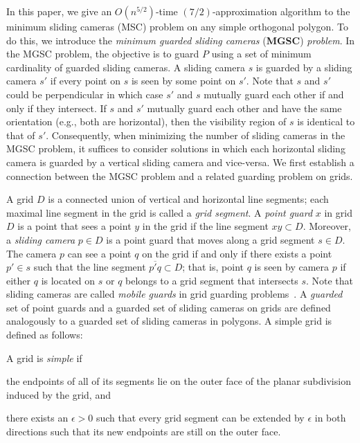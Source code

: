 \documentclass{llncs}
\begin{document}
In this paper, we give an $O(n^{5/2})$-time $(7/2)$-approximation algorithm to the minimum sliding cameras (MSC)
problem on any simple orthogonal polygon.
To do this, we introduce the \emph{minimum guarded sliding cameras} ({\bf MGSC})
\emph{problem}. In the MGSC problem, the objective is to guard $P$ using a set of minimum
cardinality of guarded sliding cameras.
A sliding camera $s$ is guarded by a sliding camera $s'$ if every point on $s$ is seen by some point on $s'$. Note that $s$ and $s'$ could be perpendicular in which case $s'$ and $s$ mutually guard each other if and only if they intersect. If $s$ and $s'$ mutually guard each other and have the same orientation (e.g., both are horizontal), then the visibility region of $s$ is identical to that of $s'$. Consequently, when minimizing the number of sliding cameras in the MGSC problem, it suffices to consider solutions in which each horizontal sliding camera is guarded by a vertical sliding camera and vice-versa.
We first establish a connection between the MGSC problem and a related guarding problem on grids.

A grid $D$ is a connected union of vertical and horizontal line segments;
each maximal line segment in the grid is called a \emph{grid segment}. A \emph{point guard} $x$
in grid $D$ is a point that sees a point $y$ in the grid if the
line segment $xy\subset D$. Moreover, a \emph{sliding camera}
$p\in D$ is a point guard that moves along a grid
segment $s\in D$. The camera $p$ can see a point $q$ on the grid if and
only if there exists a point $p'\in s$ such that the line segment
$\overline{p'q}\subset D$; that is, point $q$ is seen by camera $p$ if
either $q$ is located on $s$ or $q$ belongs to a grid segment that
intersects $s$. Note that sliding cameras are called \emph{mobile guards} in
grid guarding problems~\cite{kosowski2004,adrian2006}. A \emph{guarded} set of point guards and a guarded set of sliding cameras on grids
are defined analogously to a guarded set of sliding cameras in polygons. A simple grid is defined as follows:

\begin{definition}
A grid is \emph{simple} if \begin{inparaenum}[(i)]\item the
endpoints of all of its segments lie on the outer face of the planar
subdivision induced by the grid, and
\item there exists an $\epsilon>0$ such that every grid segment can
be extended by $\epsilon$ in both directions such that its new
endpoints are still on the outer face. \end{inparaenum}
\end{definition}
\end{document}

